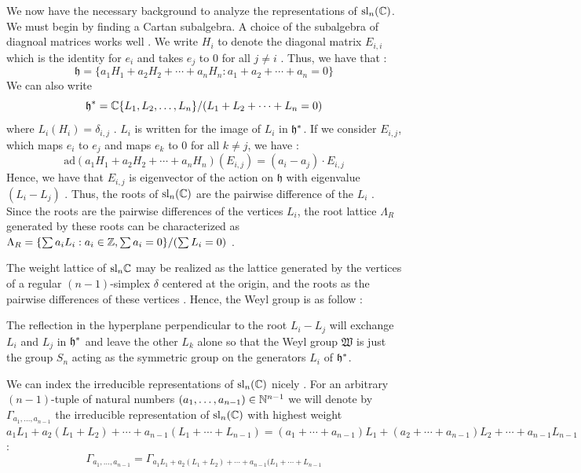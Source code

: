 \documentclass[11pt, a4paper, oneside]{article}
\theoremstyle{plain}
\theoremstyle{definition}
\theoremstyle{example}
\def\ad{\mathrm{ad}}
\begin{document}
We now have the necessary background to analyze the representations of $\mathrm{sl}_n(\mathbb{C})$. We must begin by finding a Cartan subalgebra. A choice of the subalgebra of diagnoal matrices works well \cite[\S 15.1]{fulton}. We write $H_i$ to denote the diagonal matrix $E_{i,i}$ which is the identity for $e_i$ and takes $e_j$ to $0$ for all $j \neq i$ \cite[\S 15.1]{fulton}. Thus, we have that \cite[\S 15.1]{fulton}: $$\mathfrak{h} = \{a_1H_1 + a_2H_2 + \cdots + a_nH_n: a_1 + a_2 + \cdots + a_n = 0\}$$ We can also write $$\mathfrak{h}^* = \mathbb{C}\{L_1, L_2, \ldots, L_n\}/(L_1 + L_2 + \cdots + L_n = 0)$$ where $L_i(H_i) = \delta_{i ,j}$ \cite[\S 15.1]{fulton}. $L_i$ is written for the image of $L_i$ in $\mathfrak{h}^*$. If we consider $E_{i, j}$, which maps $e_i$ to $e_j$ and maps $e_k$ to $0$ for all $k \neq j$, we have \cite[\S 15.1]{fulton}: $$\ad(a_1 H_1 + a_2 H_2 + \cdots + a_n H_n)(E_{i,j}) = (a_i - a_j) \cdot E_{i,j}$$ Hence, we have that $E_{i,j}$ is eigenvector of the action on $\mathfrak{h}$ with eigenvalue $(L_i - L_j)$ \cite[\S 15.1]{fulton}. Thus, the roots of $\mathrm{sl}_n(\mathbb{C})$ are the pairwise difference of the $L_i$ \cite[\S 15.1]{fulton}. Since the roots are the pairwise differences of the vertices $L_i$, the root lattice $\Lambda_R$ generated by these roots can be characterized as $\Lambda_R = \{\sum a_i L_i: a_i \in \mathbb{Z}, \sum a_i = 0\}/(\sum L_i = 0)$ \cite[\S 15.1]{fulton}.

\par
The weight lattice of $\mathrm{sl}_n \mathbb{C}$ may be realized as the lattice generated by the vertices of a regular $(n-1)$-simplex $\delta$ centered at the origin, and the roots as the pairwise differences of these vertices \cite[\S 15.1]{fulton}. Hence, the Weyl group is as follow \cite[\S 15.1]{fulton}:

\par
The reflection in the hyperplane perpendicular to the root $L_i - L_j$ will exchange  $L_i$ and $L_j$ in $\mathfrak{h}^*$ and leave the other $L_k$ alone so that the Weyl group $\mathfrak{W}$ is just the group $S_n$ acting as the symmetric group on the generators $L_i$ of $\mathfrak{h}^*$.


\par
We can index the irreducible representations of $\mathrm{sl}_n(\mathbb{C})$ nicely \cite[\S 15.1]{fulton}. For an arbitrary $(n-1)$-tuple of natural numbers $(a_1, \ldots, a_{n-1}) \in \mathbb{N}^{n-1}$ we will denote by $\Gamma_{a_1, \ldots, a_{n-1}}$ the irreducible representation of $\mathrm{sl}_n(\mathbb{C})$ with highest weight $a_1 L_1 + a_2 (L_1 + L_2) + \cdots + a_{n-1} (L_1 + \cdots + L_{n-1}) = (a_1 + \cdots + a_{n-1}) L_1 + (a_2 + \cdots + a_{n-1}) L_2 + \cdots + a_{n-1} L_{n-1}$ \cite[\S 15.1]{fulton}: $$\Gamma_{a_1, \ldots, a_{n-1}} = \Gamma_{a_1 L_1 + a_2 (L_1 + L_2) + \cdots + a_{n-1} (L_1 + \cdots + L_{n-1}}$$
\end{document}
